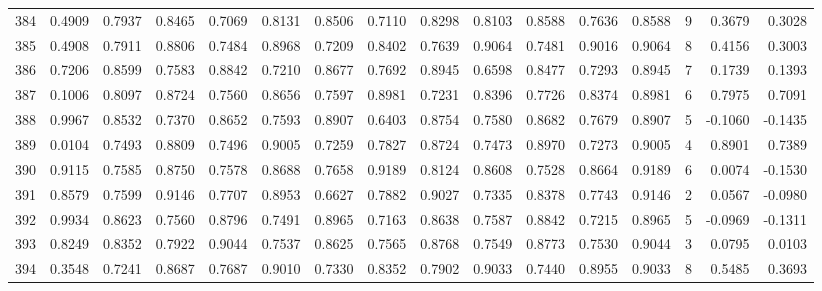 \begin{tabular}{lrrrrrrrrrrrrrrr}
384 &      0.4909 &  0.7937 &  0.8465 &  0.7069 &  0.8131 &  0.8506 &  0.7110 &  0.8298 &  0.8103 &  0.8588 &   0.7636 &     0.8588 &      9 &                    0.3679 &                     0.3028 \\
385 &      0.4908 &  0.7911 &  0.8806 &  0.7484 &  0.8968 &  0.7209 &  0.8402 &  0.7639 &  0.9064 &  0.7481 &   0.9016 &     0.9064 &      8 &                    0.4156 &                     0.3003 \\
386 &      0.7206 &  0.8599 &  0.7583 &  0.8842 &  0.7210 &  0.8677 &  0.7692 &  0.8945 &  0.6598 &  0.8477 &   0.7293 &     0.8945 &      7 &                    0.1739 &                     0.1393 \\
387 &      0.1006 &  0.8097 &  0.8724 &  0.7560 &  0.8656 &  0.7597 &  0.8981 &  0.7231 &  0.8396 &  0.7726 &   0.8374 &     0.8981 &      6 &                    0.7975 &                     0.7091 \\
388 &      0.9967 &  0.8532 &  0.7370 &  0.8652 &  0.7593 &  0.8907 &  0.6403 &  0.8754 &  0.7580 &  0.8682 &   0.7679 &     0.8907 &      5 &                   -0.1060 &                    -0.1435 \\
389 &      0.0104 &  0.7493 &  0.8809 &  0.7496 &  0.9005 &  0.7259 &  0.7827 &  0.8724 &  0.7473 &  0.8970 &   0.7273 &     0.9005 &      4 &                    0.8901 &                     0.7389 \\
390 &      0.9115 &  0.7585 &  0.8750 &  0.7578 &  0.8688 &  0.7658 &  0.9189 &  0.8124 &  0.8608 &  0.7528 &   0.8664 &     0.9189 &      6 &                    0.0074 &                    -0.1530 \\
391 &      0.8579 &  0.7599 &  0.9146 &  0.7707 &  0.8953 &  0.6627 &  0.7882 &  0.9027 &  0.7335 &  0.8378 &   0.7743 &     0.9146 &      2 &                    0.0567 &                    -0.0980 \\
392 &      0.9934 &  0.8623 &  0.7560 &  0.8796 &  0.7491 &  0.8965 &  0.7163 &  0.8638 &  0.7587 &  0.8842 &   0.7215 &     0.8965 &      5 &                   -0.0969 &                    -0.1311 \\
393 &      0.8249 &  0.8352 &  0.7922 &  0.9044 &  0.7537 &  0.8625 &  0.7565 &  0.8768 &  0.7549 &  0.8773 &   0.7530 &     0.9044 &      3 &                    0.0795 &                     0.0103 \\
394 &      0.3548 &  0.7241 &  0.8687 &  0.7687 &  0.9010 &  0.7330 &  0.8352 &  0.7902 &  0.9033 &  0.7440 &   0.8955 &     0.9033 &      8 &                    0.5485 &                     0.3693 \\

\end{tabular}
